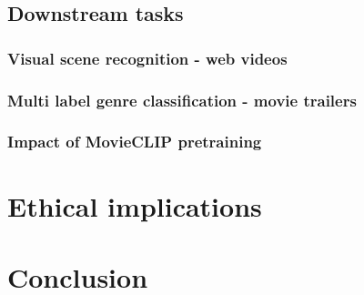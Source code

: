 \subsection{Downstream tasks}
\subsubsection{Visual scene recognition - web videos}
\subsubsection{Multi label genre classification - movie trailers}
\subsubsection{Impact of MovieCLIP pretraining}
\section{Ethical implications}
\section{Conclusion}
